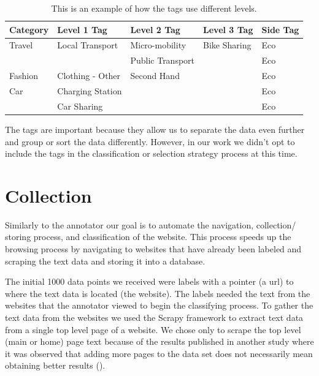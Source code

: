\begin{table}[h]
\begin{tabular}{|l|l|l|l|l|}
\hline
Category    & Level 1 Tag           & Level 2 Tag        & Level 3 Tag  & Side Tag \\ \hline
Travel      & Local Transport       & Micro-mobility     & Bike Sharing & Eco      \\ \hline
            &                       & Public Transport   &              & Eco      \\ \hline
Fashion     & Clothing - Other      & Second Hand        &              & Eco      \\ \hline
Car         & Charging Station      &                    &              & Eco      \\ \hline
            & Car Sharing           &                    &              & Eco      \\ \hline
\end{tabular}
\caption{This is an example of how the tags use different levels.}
\label{tab:tags}
\end{table}

The tags are important because they allow us to separate the data even further and group or sort the data differently. However, in our work we didn't opt to include the tags in the classification or selection strategy process at this time.

\section{Collection}

Similarly to the annotator our goal is to automate the navigation, collection/ storing process, and classification of the website. This process speeds up the browsing process by navigating to websites that have already been labeled and scraping the text data and storing it into a database.

The initial 1000 data points we received were labels with a pointer (a url) to where the text data is located (the website). The labels needed the text from the websites that the annotator viewed to begin the classifying process. To gather the text data from the websites we used the Scrapy framework to extract text data from a single top level page of a website. We chose only to scrape the top level (main or home) page text because of the results published in another study where it was observed that adding more pages to the data set does not necessarily mean obtaining better results (\cite{sahid2019ecommerce}). 

